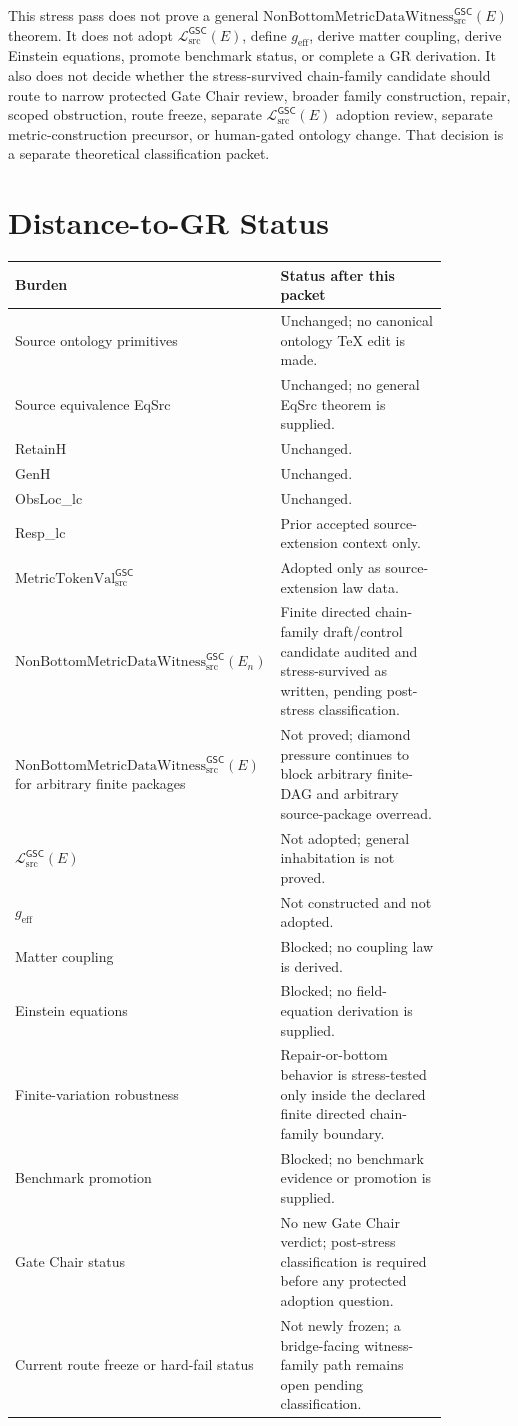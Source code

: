 \documentclass[11pt]{article}
\newcommand{\MetricTokenVal}{\mathrm{MetricTokenVal}_{\mathrm{src}}^{\mathsf{GSC}}}
\newcommand{\Witness}{\mathrm{NonBottomMetricDataWitness}_{\mathrm{src}}^{\mathsf{GSC}}}
\newcommand{\MetricData}{\mathcal{L}_{\mathrm{src}}^{\mathsf{GSC}}}
\newcommand{\geff}{g_{\mathrm{eff}}}
\newcommand{\En}{E_n}
\begin{document}
This stress pass does not prove a general \(\Witness(E)\) theorem. It does
not adopt \(\MetricData(E)\), define \(\geff\), derive matter coupling, derive
Einstein equations, promote benchmark status, or complete a GR derivation. It
also does not decide whether the stress-survived chain-family candidate
should route to narrow protected Gate Chair review, broader family
construction, repair, scoped obstruction, route freeze, separate
\(\MetricData(E)\) adoption review, separate metric-construction precursor,
or human-gated ontology change. That decision is a separate theoretical
classification packet.

\section{Distance-to-GR Status}

\begin{longtable}{p{0.30\linewidth}p{0.56\linewidth}}
\toprule
Burden & Status after this packet \\
\midrule
Source ontology primitives & Unchanged; no canonical ontology TeX edit is made. \\
Source equivalence EqSrc & Unchanged; no general EqSrc theorem is supplied. \\
RetainH & Unchanged. \\
GenH & Unchanged. \\
ObsLoc\_lc & Unchanged. \\
Resp\_lc & Prior accepted source-extension context only. \\
\(\MetricTokenVal\) & Adopted only as source-extension law data. \\
\(\Witness(\En)\) & Finite directed chain-family draft/control candidate
audited and stress-survived as written, pending post-stress classification. \\
\(\Witness(E)\) for arbitrary finite packages & Not proved; diamond pressure
continues to block arbitrary finite-DAG and arbitrary source-package overread. \\
\(\MetricData(E)\) & Not adopted; general inhabitation is not proved. \\
\(\geff\) & Not constructed and not adopted. \\
Matter coupling & Blocked; no coupling law is derived. \\
Einstein equations & Blocked; no field-equation derivation is supplied. \\
Finite-variation robustness & Repair-or-bottom behavior is stress-tested only
inside the declared finite directed chain-family boundary. \\
Benchmark promotion & Blocked; no benchmark evidence or promotion is supplied. \\
Gate Chair status & No new Gate Chair verdict; post-stress classification is
required before any protected adoption question. \\
Current route freeze or hard-fail status & Not newly frozen; a
bridge-facing witness-family path remains open pending classification. \\
\bottomrule
\end{longtable}
\end{document}
